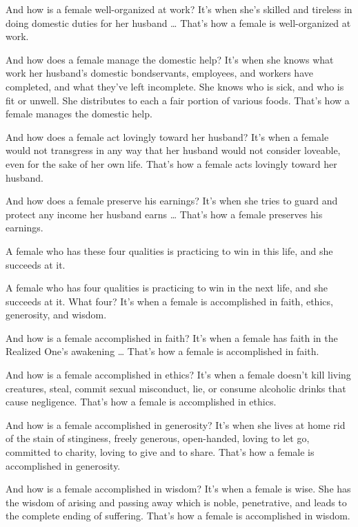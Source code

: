 \documentclass[12pt,openany]{book}%
\begin{document}
And how is a female well-organized at work? It’s when she’s skilled and tireless in doing domestic duties for her husband … That’s how a female is well-organized at work. 

And how does a female manage the domestic help? It’s when she knows what work her husband’s domestic bondservants, employees, and workers have completed, and what they’ve left incomplete. She knows who is sick, and who is fit or unwell. She distributes to each a fair portion of various foods. That’s how a female manages the domestic help. 

And how does a female act lovingly toward her husband? It’s when a female would not transgress in any way that her husband would not consider loveable, even for the sake of her own life. That’s how a female acts lovingly toward her husband. 

And how does a female preserve his earnings? It’s when she tries to guard and protect any income her husband earns … That’s how a female preserves his earnings. 

A female who has these four qualities is practicing to win in this life, and she succeeds at it. 

A female who has four qualities is practicing to win in the next life, and she succeeds at it. What four? It’s when a female is accomplished in faith, ethics, generosity, and wisdom. 

And how is a female accomplished in faith? It’s when a female has faith in the Realized One’s awakening … That’s how a female is accomplished in faith. 

And how is a female accomplished in ethics? It’s when a female doesn’t kill living creatures, steal, commit sexual misconduct, lie, or consume alcoholic drinks that cause negligence. That’s how a female is accomplished in ethics. 

And how is a female accomplished in generosity? It’s when she lives at home rid of the stain of stinginess, freely generous, open-handed, loving to let go, committed to charity, loving to give and to share. That’s how a female is accomplished in generosity. 

And how is a female accomplished in wisdom? It’s when a female is wise. She has the wisdom of arising and passing away which is noble, penetrative, and leads to the complete ending of suffering. That’s how a female is accomplished in wisdom. 
\end{document}
